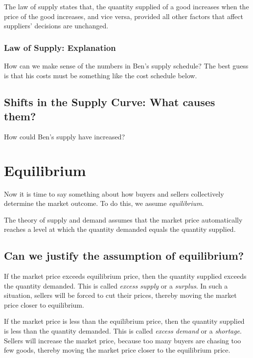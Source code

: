 \documentclass[
  letterpaper,
]{book}
\begin{document}
The law of supply states that, the quantity supplied of a good increases
when the price of the good increases, and vice versa, provided all other
factors that affect suppliers' decisions are unchanged.

\subsubsection{Law of Supply:
Explanation}\label{law-of-supply-explanation}

How can we make sense of the numbers in Ben's supply schedule? The best
guess is that his costs must be something like the cost schedule below.

\subsection{Shifts in the Supply Curve: What causes
them?}\label{shifts-in-the-supply-curve-what-causes-them}

How could Ben's supply have increased?

\section{Equilibrium}\label{equilibrium}

Now it is time to say something about how buyers and sellers
collectively determine the market outcome. To do this, we assume
\emph{equilibrium}.

The theory of supply and demand assumes that the market price
automatically reaches a level at which the quantity demanded equals the
quantity supplied.

\subsection{Can we justify the assumption of
equilibrium?}\label{can-we-justify-the-assumption-of-equilibrium}

If the market price exceeds equilibrium price, then the quantity
supplied exceeds the quantity demanded. This is called \emph{excess
supply} or a \emph{surplus}. In such a situation, sellers will be forced
to cut their prices, thereby moving the market price closer to
equilibrium.

If the market price is less than the equilibrium price, then the
quantity supplied is less than the quantity demanded. This is called
\emph{excess demand} or a \emph{shortage}. Sellers will increase the
market price, because too many buyers are chasing too few goods, thereby
moving the market price closer to the equilibrium price.
\end{document}
